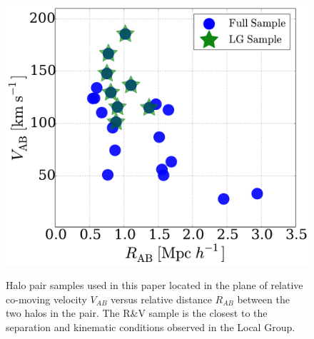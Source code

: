 \documentclass{emulateapj}
\begin{document}
\begin{figure}
\centering
\includegraphics[width=\hsize]{v_r_pairs.pdf}\\
\caption{Halo pair samples used in this paper located in the
  plane of relative co-moving velocity $V_{AB}$ versus relative
  distance $R_{AB}$ between the two halos in the pair.
  The R\&V sample is the closest to the separation and kinematic
  conditions observed in the Local Group.} 
\label{fig:samples}
\end{figure}

\end{document}
